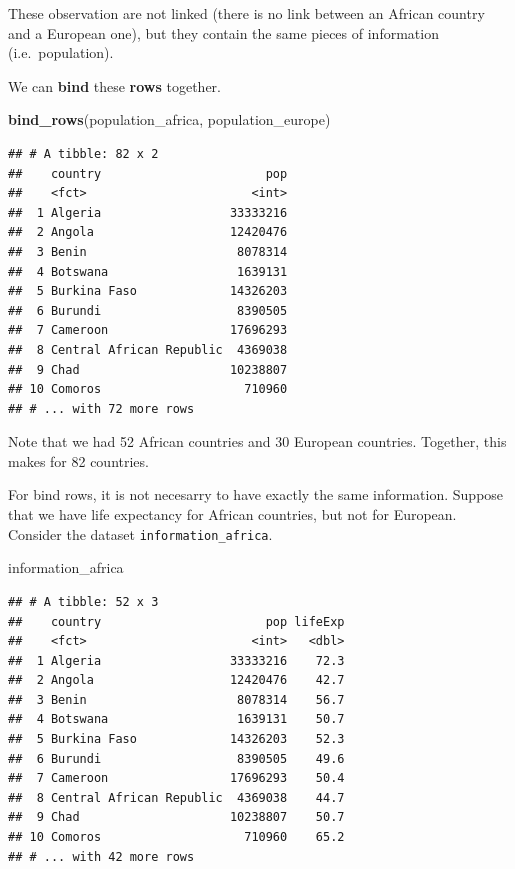 \documentclass[]{tufte-book}
\newenvironment{Shaded}{}{}
\newcommand{\KeywordTok}[1]{\textcolor[rgb]{0.00,0.44,0.13}{\textbf{#1}}}
\newcommand{\NormalTok}[1]{#1}
\begin{document}
These observation are not linked (there is no link between an African country and a European one), but they contain the same pieces of information (i.e.~population).

We can \textbf{bind} these \textbf{rows} together.

\begin{Shaded}
\begin{Highlighting}[]
\KeywordTok{bind_rows}\NormalTok{(population_africa, population_europe)}
\end{Highlighting}
\end{Shaded}

\begin{verbatim}
## # A tibble: 82 x 2
##    country                       pop
##    <fct>                       <int>
##  1 Algeria                  33333216
##  2 Angola                   12420476
##  3 Benin                     8078314
##  4 Botswana                  1639131
##  5 Burkina Faso             14326203
##  6 Burundi                   8390505
##  7 Cameroon                 17696293
##  8 Central African Republic  4369038
##  9 Chad                     10238807
## 10 Comoros                    710960
## # ... with 72 more rows
\end{verbatim}

Note that we had 52 African countries and 30 European countries. Together, this makes for 82 countries.

For bind rows, it is not necesarry to have exactly the same information. Suppose that we have life expectancy for African countries, but not for European. Consider the dataset \texttt{information\_africa}.

\begin{Shaded}
\begin{Highlighting}[]
\NormalTok{information_africa }
\end{Highlighting}
\end{Shaded}

\begin{verbatim}
## # A tibble: 52 x 3
##    country                       pop lifeExp
##    <fct>                       <int>   <dbl>
##  1 Algeria                  33333216    72.3
##  2 Angola                   12420476    42.7
##  3 Benin                     8078314    56.7
##  4 Botswana                  1639131    50.7
##  5 Burkina Faso             14326203    52.3
##  6 Burundi                   8390505    49.6
##  7 Cameroon                 17696293    50.4
##  8 Central African Republic  4369038    44.7
##  9 Chad                     10238807    50.7
## 10 Comoros                    710960    65.2
## # ... with 42 more rows
\end{verbatim}
\end{document}
